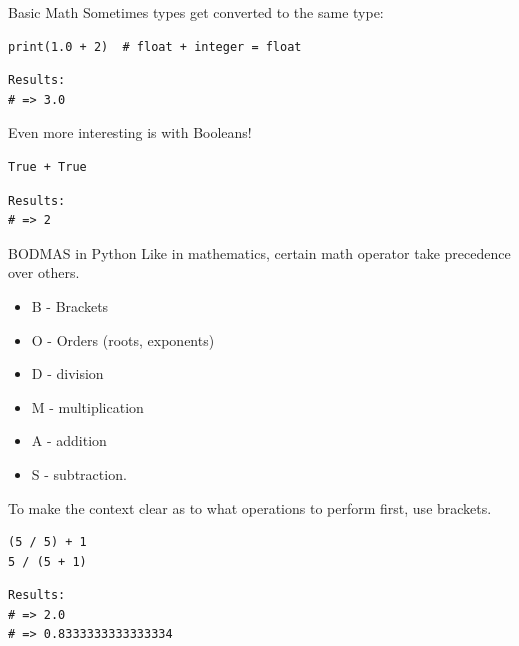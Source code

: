 \documentclass[10pt]{beamer}
\begin{document}
\begin{frame}[label={sec:orgd936937},fragile]{Basic Math}
 Sometimes types get converted to the same type:

\begin{verbatim}
print(1.0 + 2)  # float + integer = float
\end{verbatim}

\begin{verbatim}
Results: 
# => 3.0
\end{verbatim}


Even more interesting is with Booleans!

\begin{verbatim}
True + True
\end{verbatim}

\begin{verbatim}
Results: 
# => 2
\end{verbatim}
\end{frame}

\begin{frame}[label={sec:org3f52a19},fragile]{BODMAS in Python}
 Like in mathematics, certain math operator take precedence over others.

\begin{itemize}
\item B - Brackets
\item O - Orders (roots, exponents)
\item D - division
\item M - multiplication
\item A - addition
\item S - subtraction.
\end{itemize}

To make the context clear as to what operations to perform first, use brackets.

\begin{verbatim}
(5 / 5) + 1
5 / (5 + 1)
\end{verbatim}

\begin{verbatim}
Results: 
# => 2.0
# => 0.8333333333333334
\end{verbatim}
\end{frame}
\end{document}
